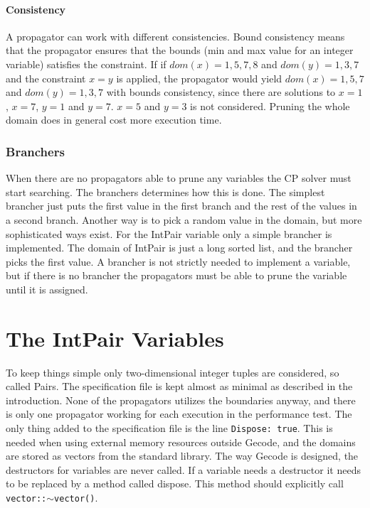 \documentclass[a4paper,11pt]{article}
\begin{document}
\paragraph{Consistency}
A propagator can work with different consistencies. Bound consistency means that the propagator ensures that the bounds (min and max value for an integer variable) satisfies the constraint. If if $dom(x)={1,5,7,8}$ and $dom(y)={1,3,7}$ and the constraint $x=y$ is applied, the propagator would yield $dom(x)={1,5,7}$ and $dom(y)={1,3,7}$ with bounds consistency, since there are solutions to $x=1$, $x=7$, $y=1$ and $y=7$. $x=5$ and $y=3$ is not considered. Pruning the whole domain does in general cost more execution time.

\subsubsection{Branchers}
When there are no propagators able to prune any variables the CP solver must start searching. The branchers determines how this is done. The simplest brancher just puts the first value in the first branch and the rest of the values in a second branch. Another way is to pick a random value in the domain, but more sophisticated ways exist. For the IntPair variable only a simple brancher is implemented. The domain of IntPair is just a long sorted list, and the brancher picks the first value. A brancher is not strictly needed to implement a variable, but if there is no brancher the propagators must be able to prune the variable until it is assigned. 

\section{The IntPair Variables}
To keep things simple only two-dimensional integer tuples are considered, so called Pairs. The specification file is kept almost as minimal as described in the introduction. None of the propagators utilizes the boundaries anyway, and there is only one propagator working for each execution in the performance test. The only thing added to the specification file is the line \texttt{Dispose: true}. This is needed when using external memory resources outside Gecode, and the domains are stored as vectors from the standard library. The way Gecode is designed, the destructors for variables are never called. If a variable needs a destructor it needs to be replaced by a method called dispose. This method should explicitly call \texttt{vector::$\sim$vector()}.
\end{document}
